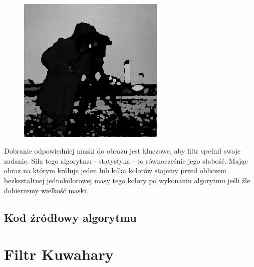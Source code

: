 \documentclass[a4paper,12pt]{book}
\begin{document}
\begin{figure}[H]
				\includegraphics[width=7cm, height=7cm]{man-filter-modal27x27.png}
			\end{figure}
			Dobranie odpowiedniej maski do obrazu jest kluczowe, aby filtr spełnił swoje zadanie. Siła tego algorytmu - statystyka - to równocześnie jego słabość. Mając obraz na którym króluje jeden lub kilka kolorów stajemy przed obliczem bezkształtnej jednokolorowej masy tego kolory po wykonaniu algorytmu jeśli źle dobierzemy wielkość maski. 
		\subsection{Kod źródłowy algorytmu}
	\section{Filtr Kuwahary}
\end{document}

